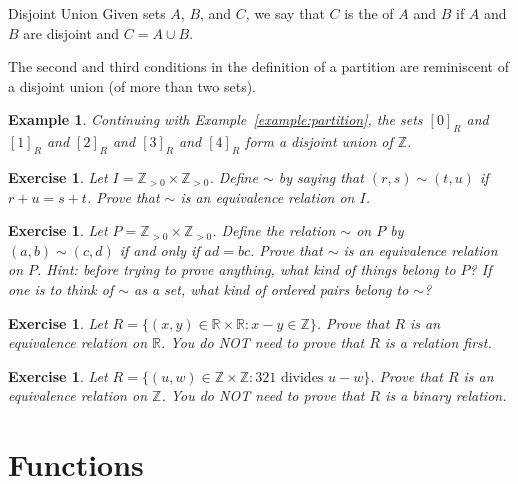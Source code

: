 \documentclass{book}
\newcounter{ekcounter}%
\theoremstyle{ekimcustom}
\newtheorem{example}[ekcounter]{Example}
\newtheorem{exercise}[ekcounter]{Exercise}
\newcommand\defn[1]{{\color{blue}{\bf #1}}}
\begin{document}
\begin{bdefinition}{Disjoint Union}{}
Given sets $A$, $B$, and $C$, we say that $C$ is the \defn{disjoint union} of $A$ and $B$ if $A$ and $B$ are disjoint and $C = A \cup B$.
\end{bdefinition}
The second and third conditions in the definition of a partition are reminiscent of a disjoint union (of more than two sets).
\begin{example}
Continuing with Example~\ref{example:partition}, the sets $[0]_R$ and $[1]_R$ and $[2]_R$ and $[3]_R$ and $[4]_R$ form a disjoint union of $\mathbb{Z}$.
\end{example}

\begin{exercise}
Let $I = \mathbb{Z}_{>0} \times \mathbb{Z}_{>0}$. Define $\sim$ by saying that $(r,s) \sim (t,u)$ if $r+u=s+t$. Prove that $\sim$ is an equivalence relation on $I$.
\end{exercise}

\begin{exercise}
Let $P = \mathbb{Z}_{>0} \times \mathbb{Z}_{>0}$. Define the relation $\sim$ on $P$ by $(a,b) \sim (c,d)$ if and only if $ad=bc$. Prove that $\sim$ is an equivalence relation on $P$. Hint: before trying to prove anything, what kind of things belong to $P$? If one is to think of $\sim$ as a set, what kind of ordered pairs belong to $\sim$?
\end{exercise}

\begin{exercise}
Let $R = \{(x,y) \in \mathbb{R} \times \mathbb{R} : x-y \in \mathbb{Z}\}$. Prove that $R$ is an equivalence relation on $\mathbb{R}$. You do NOT need to prove that $R$ is a relation first.
\end{exercise}

\begin{exercise}
Let $R = \{(u,w) \in \mathbb{Z} \times \mathbb{Z} : 321 \text{ divides } u-w\}$. Prove that $R$ is an equivalence relation on $\mathbb{Z}$. You do NOT need to prove that $R$ is a binary relation.
\end{exercise}


\section{Functions}\label{section:functions}
\end{document}
